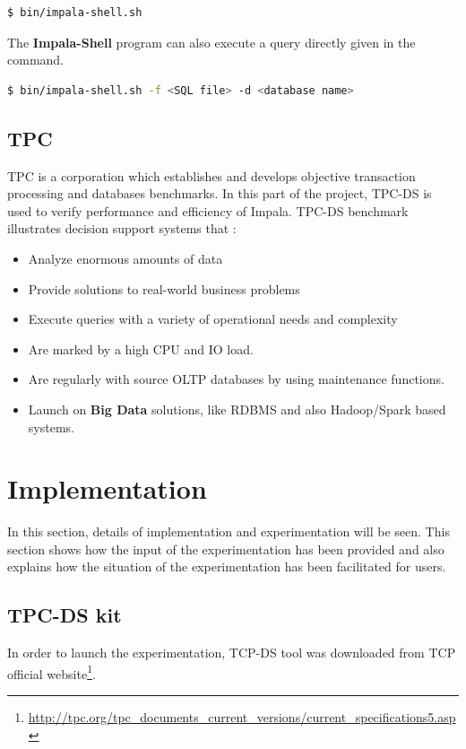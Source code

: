 \documentclass{article}
\newcommand\bld[1]{\textbf{#1}}
\begin{document}
\vspace{0.5cm}
\begin{lstlisting}[language=bash]
$ bin/impala-shell.sh
\end{lstlisting}

The \textbf{Impala-Shell} program can also execute a query directly given in the command.
\vspace{0.5cm}
\begin{lstlisting}[language=bash]
$ bin/impala-shell.sh -f <SQL file> -d <database name>
\end{lstlisting}

\subsection{TPC}
TPC is a corporation which establishes and develops objective transaction processing and databases benchmarks. In this part of the project, TPC-DS is used to verify performance and efficiency of Impala. TPC-DS benchmark illustrates decision support systems that :
\begin{itemize}
    \item Analyze enormous amounts of data
    \item Provide solutions to real-world business problems
    \item Execute queries with a variety of operational needs and complexity
    \item Are marked by a high CPU and IO load.
    \item Are regularly with source OLTP databases by using maintenance functions.
    \item Launch on \bld{Big Data} solutions, like RDBMS and also Hadoop/Spark based systems.
\end{itemize}

\section{Implementation}
In this section, details of implementation and experimentation will be seen. This section shows how the input of the experimentation has been provided and also explains how the situation of the experimentation has been facilitated for users. 

\subsection{TPC-DS kit}
In order to launch the experimentation, TCP-DS tool was downloaded from TCP official website\footnote{\url{http://tpc.org/tpc_documents_current_versions/current_specifications5.asp}}.
\end{document}
